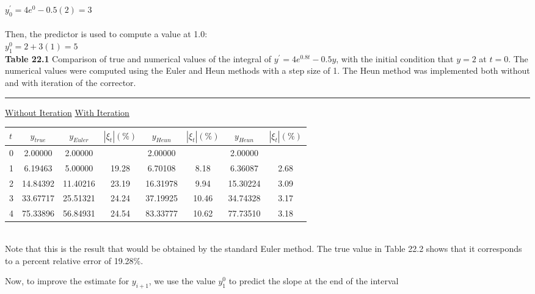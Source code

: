 \documentclass[../main.tex]{subfiles}
\begin{document}
$y^{'}_{0} = 4e^0 - 0.5(2) = 3$\\
\\
Then, the predictor is used to compute a value at 1.0:\\

$y^{0}_{1} = 2 + 3(1) = 5$\\

\vspace{0,3in}
\textbf{Table 22.1} Comparison of true and numerical values of the integral of $y^{'} = 4e^{0.8t} - 0.5y$, with the initial condition that $y=2$ at $t=0$. The numerical values
were computed using the Euler and Heun methods with a step size of 1.
The Heun method was implemented both without and with iteration of
the corrector.\\
\hrule
\begin{flushright}
\underline{Without Iteration} \; \; \underline{With Iteration}
\end{flushright} 
\begin{tabular}{lccccccc}
\textbf{$t$} \; \; \; \; & \textbf{$y_{true}$} \; \; \; \; & \textbf{$y_{Euler}$} \; \; \; \; & \textbf{$|\xi_{t}|(\%)$} \; \; \; \; &  \textbf{$y_{Heun}$} \; \; \; \; & \textbf{$|\xi_{t}|(\%)$} \; \; \; \; & \textbf{$y_{Heun}$} \; \; \; \; & \textbf{$|\xi_{t}|(\%)$}\\
\hline
0 & 2.00000 & 2.00000 & \vspace{0in} & 2.00000 & \vspace{0in} & 2.00000 & \vspace{0in}\\

1 & 6.19463 & 5.00000 & 19.28 & 6.70108 & 8.18 & 6.36087 & 2.68\\

2 & 14.84392 & 11.40216 & 23.19 & 16.31978 & 9.94 & 15.30224 & 3.09\\

3 & 33.67717 & 25.51321 & 24.24 & 37.19925 & 10.46 & 34.74328 & 3.17\\

4 & 75.33896 & 56.84931 & 24.54 & 83.33777 & 10.62 & 77.73510 & 3.18\\
\hline
\end{tabular}
\vspace{0,1in}
\\
Note that this is the result that would be obtained by the standard Euler method. The true
value in Table 22.2 shows that it corresponds to a percent relative error of 19.28\%.

Now, to improve the estimate for $y_{i+1}$, we use the value $y^0_1$ to predict the slope at the
end of the interval\\
\end{document}
